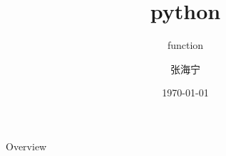 \documentclass{beamer}
\title[Django]{python} %
\subtitle{function}
\author{张海宁} %
\institute[计算机科学与技术学院] %
{
贵州大学 \\ %
\medskip
\textit{hnzhang1@gzu.edu.cn} %
}
\date{\today} %
\begin{document}
\begin{frame}
\titlepage %
\end{frame}
\begin{frame}{Overview}
\tableofcontents
\end{frame}




\end{document}
